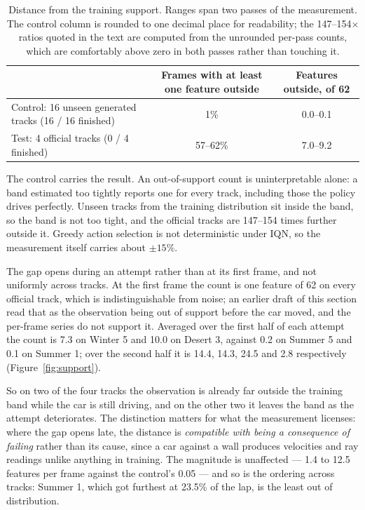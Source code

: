 \documentclass[11pt]{article}
\begin{document}
\begin{table}[h]
\centering
\small
\begin{tabular}{@{}L{4.5cm}cc@{}}
\toprule
 & \textbf{Frames with at least one feature outside} & \textbf{Features outside, of 62} \\
\midrule
Control: 16 unseen generated tracks (16 / 16 finished) & 1\% & 0.0--0.1 \\
Test: 4 official tracks (0 / 4 finished) & 57--62\% & 7.0--9.2 \\
\bottomrule
\end{tabular}
\caption{Distance from the training support. Ranges span two passes of the measurement. The control column is rounded to one decimal place for readability; the 147--154$\times$ ratios quoted in the text are computed from the unrounded per-pass counts, which are comfortably above zero in both passes rather than touching it.}
\label{tab:supportdistance}
\end{table}

The control carries the result. An out-of-support count is uninterpretable alone: a band estimated too tightly reports one for every track, including those the policy drives perfectly. Unseen tracks from the training distribution sit inside the band, so the band is not too tight, and the official tracks are 147--154 times further outside it. Greedy action selection is not deterministic under IQN, so the measurement itself carries about $\pm15\%$.

The gap opens during an attempt rather than at its first frame, and not uniformly across tracks. At the first frame the count is one feature of 62 on every official track, which is indistinguishable from noise; an earlier draft of this section read that as the observation being out of support before the car moved, and the per-frame series do not support it. Averaged over the first half of each attempt the count is 7.3 on Winter 5 and 10.0 on Desert 3, against 0.2 on Summer 5 and 0.1 on Summer 1; over the second half it is 14.4, 14.3, 24.5 and 2.8 respectively (Figure~\ref{fig:support}).

So on two of the four tracks the observation is already far outside the training band while the car is still driving, and on the other two it leaves the band as the attempt deteriorates. The distinction matters for what the measurement licenses: where the gap opens late, the distance is \emph{compatible with being a consequence of failing} rather than its cause, since a car against a wall produces velocities and ray readings unlike anything in training. The magnitude is unaffected --- 1.4 to 12.5 features per frame against the control's 0.05 --- and so is the ordering across tracks: Summer 1, which got furthest at 23.5\% of the lap, is the least out of distribution.
\end{document}

